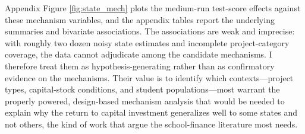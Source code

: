 Appendix Figure \ref{fig:state_mech} plots the medium-run test-score effects against these mechanism variables, and the appendix tables report the underlying summaries and bivariate associations. The associations are weak and imprecise: with roughly two dozen noisy state estimates and incomplete project-category coverage, the data cannot adjudicate among the candidate mechanisms. I therefore treat them as hypothesis-generating rather than as confirmatory evidence on the mechanisms. Their value is to identify which contexts---project types, capital-stock conditions, and student populations---most warrant the properly powered, design-based mechanism analysis that would be needed to explain why the return to capital investment generalizes well to some states and not others, the kind of work that \citet{handel2024contexts} argue the school-finance literature most needs.
